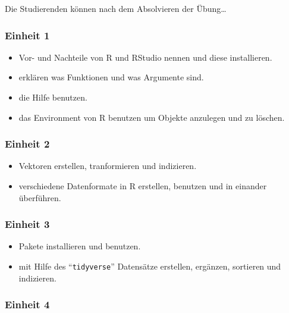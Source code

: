 \documentclass[
]{book}
\providecommand{\tightlist}{%
  \setlength{\itemsep}{0pt}\setlength{\parskip}{0pt}}
\begin{document}
Die Studierenden können nach dem Absolvieren der Übung\ldots{}

\hypertarget{einheit-1}{%
\subsubsection*{Einheit 1}\label{einheit-1}}

\begin{itemize}
\tightlist
\item
  Vor- und Nachteile von R und RStudio nennen und diese installieren.
\item
  erklären was Funktionen und was Argumente sind.
\item
  die Hilfe benutzen.
\item
  das Environment von R benutzen um Objekte anzulegen und zu löschen.
\end{itemize}

\hypertarget{einheit-2}{%
\subsubsection*{Einheit 2}\label{einheit-2}}

\begin{itemize}
\tightlist
\item
  Vektoren erstellen, tranformieren und indizieren.
\item
  verschiedene Datenformate in R erstellen, benutzen und in einander überführen.
\end{itemize}

\hypertarget{einheit-3}{%
\subsubsection*{Einheit 3}\label{einheit-3}}

\begin{itemize}
\tightlist
\item
  Pakete installieren und benutzen.
\item
  mit Hilfe des ``\texttt{tidyverse}'' Datensätze erstellen, ergänzen, sortieren und indizieren.
\end{itemize}

\hypertarget{einheit-4}{%
\subsubsection*{Einheit 4}\label{einheit-4}}
\end{document}

